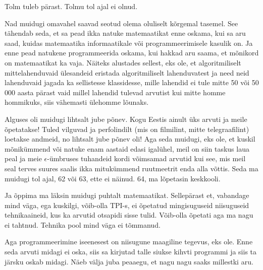 Tolm tuleb pärast. Tolmu tol ajal ei olnud. 

Nad muidugi omavahel saavad seotud olema oluliselt kõrgemal tasemel. See 
tähendab seda, et sa pead ikka natuke matemaatikat enne oskama, kui sa aru 
saad, kuidas matemaatika informaatikale või programmeerimisele kasulik on. Ja 
enne pead natukene programmeerida oskama, kui hakkad aru saama, et mõnikord on 
matemaatikat ka vaja. Näiteks alustades sellest, eks ole, et algoritmiliselt 
mittelahenduvaid ülesandeid eristada algoritmiliselt lahenduvatest ja need neid 
lahenduvaid jagada ka sellistesse klassidesse, mille lahendid ei tule mitte 50 
või 50 000 aasta pärast vaid millel lahendid tulevad arvutist kui mitte homme 
hommikuks, siis vähemasti ülehomme lõunaks.


Alguses oli muidugi lihtsalt jube põnev. Kogu Eestis ainult üks arvuti ja meile 
õpetatakse! Tuled vilguvad ja perfolindilt (mis on filmilint, mitte 
telegraafilint) loetakse andmeid,  no lihtsalt jube põnev oli! Aga seda 
muidugi, eks ole, et kuskil mõnikümmend või natuke enam aastaid edasi igalühel, 
meil on siin taskus laua peal ja meie $\epsilon$-ümbruses tuhandeid kordi võimsamad arvutid kui see, mis meil seal terves suures 
saalis ikka mitukümmend ruutmeetrit enda alla võttis. Seda ma muidugi tol ajal, 
62 või 63, ette ei näinud. 64, ma lõpetasin keskkooli. 

Ja õppima ma läksin muidugi puhtalt matemaatikat. Sellepärast et, vabandage 
mind väga, ega kuskilgi, võib-olla TPI-s, ei õpetatud mingisuguseid niisuguseid 
tehnikaaineid, kus ka arvutid otsapidi sisse tulid. Võib-olla õpetati aga ma 
nagu ei tahtnud. Tehnika pool mind väga ei tõmmanud. 

Aga programmeerimine iseenesest on niisugune maagiline tegevus, eks ole. Enne 
seda arvuti midagi ei oska, siis sa kirjutad talle siukse kihvti programmi ja 
siis ta järsku oskab midagi. Näeb välja juba peaaegu, et nagu nagu saaks 
millestki aru. 


